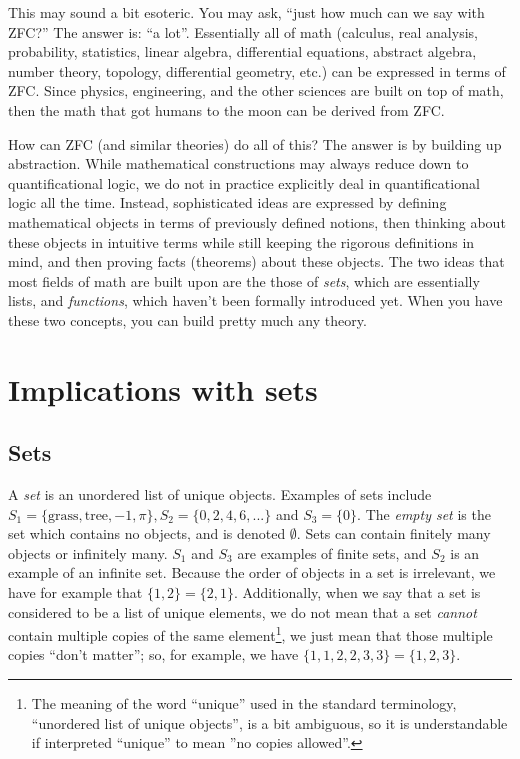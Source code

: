 This may sound a bit esoteric. You may ask, ``just how much can we say with ZFC?'' The answer is: ``a lot''. Essentially all of math (calculus, real analysis, probability, statistics, linear algebra, differential equations, abstract algebra, number theory, topology, differential geometry, etc.) can be expressed in terms of ZFC. Since physics, engineering, and the other sciences are built on top of math, then the math that got humans to the moon can be derived from ZFC.

How can ZFC (and similar theories) do all of this? The answer is by building up abstraction. While mathematical constructions may always reduce down to quantificational logic, we do not in practice explicitly deal in quantificational logic all the time. Instead, sophisticated ideas are expressed by defining mathematical objects in terms of previously defined notions, then thinking about these objects in intuitive terms while still keeping the rigorous definitions in mind, and then proving facts (theorems) about these objects. The two ideas that most fields of math are built upon are the those of \textit{sets}, which are essentially lists, and \textit{functions}, which haven't been formally introduced yet. When you have these two concepts, you can build pretty much any theory.

\newpage

\section{Implications with sets}

\subsection*{Sets}

A \textit{set} is an unordered list of unique objects. Examples of sets include $S_1 = \{\text{grass}, \text{tree}, -1, \pi\}, S_2 = \{0, 2, 4, 6, ...\}$ and $S_3 = \{0\}$. The \textit{empty set} is the set which contains no objects, and is denoted $\emptyset$. Sets can contain finitely many objects or infinitely many. $S_1$ and $S_3$ are examples of finite sets, and $S_2$ is an example of an infinite set. Because the order of objects in a set is irrelevant, we have for example that $\{1, 2\} = \{2, 1\}$. Additionally, when we say that a set is considered to be a list of unique elements, we do not mean that a set \textit{cannot} contain multiple copies of the same element\footnote{The meaning of the word ``unique'' used in the standard terminology, ``unordered list of unique objects'', is a bit ambiguous, so it is understandable if interpreted ``unique'' to mean ''no copies allowed''.}, we just mean that those multiple copies ``don't matter''; so, for example, we have $\{1, 1, 2, 2, 3, 3 \} = \{1, 2, 3\}$.

